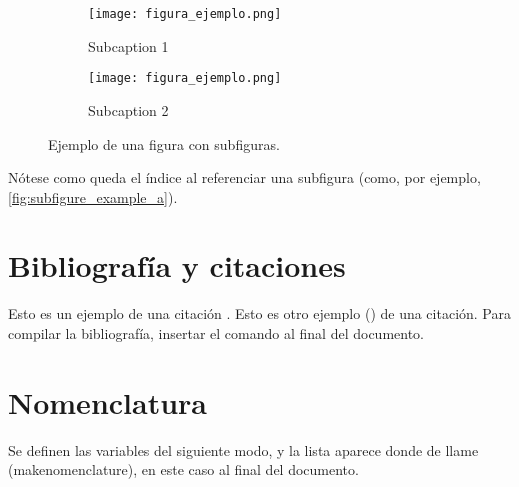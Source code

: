 \documentclass{article} %
\begin{document}
\begin{figure}[h!]
    \centering
    \begin{subfigure}[b]{0.4\textwidth}
        \centering
        \texttt{[image: figura\_ejemplo.png]}
        \caption{Subcaption 1}
        \label{fig:subfigure_example_a}
    \end{subfigure}
    \quad %
    \begin{subfigure}[b]{0.4\textwidth}
        \centering
        \texttt{[image: figura\_ejemplo.png]}
        \caption{Subcaption 2}
        \label{fig:subfigure_example_b}
    \end{subfigure}
    \caption{Ejemplo de una figura con subfiguras.}
    \label{fig:figure_with_subcaptions}
\end{figure}

Nótese como queda el índice al referenciar una subfigura (como, por ejemplo, \autoref{fig:subfigure_example_a}).

\section{Bibliografía y citaciones}
Esto es un ejemplo de una citación \cite{rocketdyne}. Esto es otro ejemplo (\cite{thermal_engs}) de una citación. Para compilar la bibliografía, insertar el comando al final del documento.

\section{Nomenclatura}
Se definen las variables del siguiente modo, y la lista aparece donde de llame (makenomenclature), en este caso al final del documento.






\printnomenclature[0.5in]

\listoftables
\listoffigures
\end{document}
